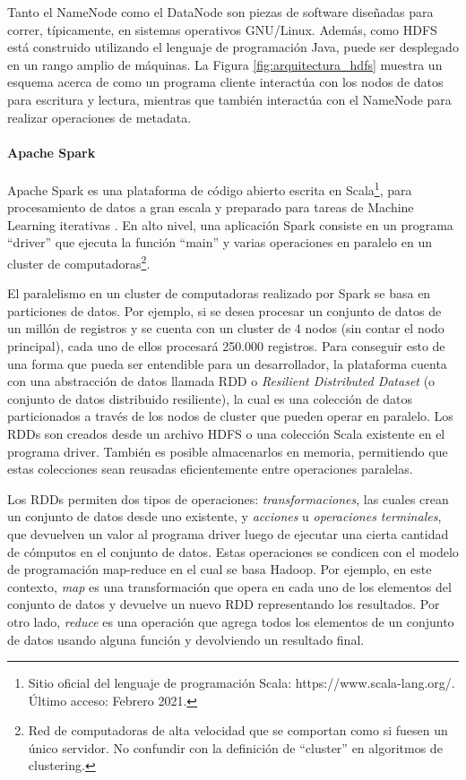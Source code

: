 \bigskip Tanto el NameNode como el DataNode son piezas de software diseñadas para correr, típicamente, en sistemas operativos GNU/Linux. Además, como HDFS está construido utilizando el lenguaje de programación Java, puede ser desplegado en un rango amplio de máquinas. La Figura \ref{fig:arquitectura_hdfs} muestra un esquema acerca de como un programa cliente interactúa con los nodos de datos para escritura y lectura, mientras que también interactúa con el NameNode para realizar operaciones de metadata.

\paragraph{Apache Spark}
Apache Spark es una plataforma de código abierto escrita en Scala\footnote{Sitio oficial del lenguaje de programación Scala: https://www.scala-lang.org/. Último acceso: Febrero 2021.}, para procesamiento de datos a gran escala y preparado para tareas de Machine Learning iterativas \citep{meng2016mllib}. En alto nivel, una aplicación Spark consiste en un programa “driver” que ejecuta la función “main” y varias operaciones en paralelo en un cluster de computadoras\footnote{Red de computadoras de alta velocidad que se comportan como si fuesen un único servidor. No confundir con la definición de “cluster” en algoritmos de clustering.}.

\bigskip El paralelismo en un cluster de computadoras realizado por Spark se basa en particiones de datos. Por ejemplo, si se desea procesar un conjunto de datos de un millón de registros y se cuenta con un cluster de 4 nodos (sin contar el nodo principal), cada uno de ellos procesará 250.000 registros. Para conseguir esto de una forma que pueda ser entendible para un desarrollador, la plataforma cuenta con una abstracción de datos llamada RDD o \textit{Resilient Distributed Dataset} (o conjunto de datos distribuido resiliente), la cual es una colección de datos particionados a través de los nodos de cluster que pueden operar en paralelo. Los RDDs son creados desde un archivo HDFS o una colección Scala existente en el programa driver. También es posible almacenarlos en memoria, permitiendo que estas colecciones sean reusadas eficientemente entre operaciones paralelas.

\bigskip Los RDDs permiten dos tipos de operaciones: \textit{transformaciones}, las cuales crean un conjunto de datos desde uno existente, y \textit{acciones} u \textit{operaciones terminales}, que devuelven un valor al programa driver luego de ejecutar una cierta cantidad de cómputos en el conjunto de datos. Estas operaciones se condicen con el modelo de programación map-reduce en el cual se basa Hadoop. Por ejemplo, en este contexto, \textit{map} es una transformación que opera en cada uno de los elementos del conjunto de datos y devuelve un nuevo RDD representando los resultados. Por otro lado, \textit{reduce} es una operación que agrega todos los elementos de un conjunto de datos usando alguna función y devolviendo un resultado final.


